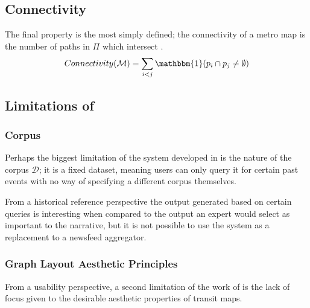 \subsection{Connectivity}
The final property is the most simply defined; the connectivity of a metro map is the number of paths in $\Pi$ which intersect \citep{GeneratingInformationMaps}.
\begin{equation}
	Connectivity(\mathcal{M}) = \sum_{i<j}\mathbbm{1}(p_i \cap p_j \neq\emptyset)
\end{equation}

\subsection{Limitations of \cite{GeneratingInformationMaps, InformationCartographyPre}}

\subsubsection{Corpus}
Perhaps the biggest limitation of the system developed in \citep{GeneratingInformationMaps, InformationCartographyPre} is the nature of the corpus $\mathcal{D}$; it is a fixed dataset, meaning users can only query it for certain past events with no way of specifying a different corpus themselves.

From a historical reference perspective the output generated based on certain queries is interesting when compared to the output an expert would select as important to the narrative, but it is not possible to use the system as a replacement to a newsfeed aggregator.

\subsubsection{Graph Layout Aesthetic Principles}

From a usability perspective, a second limitation of the work of \citeauthor{GeneratingInformationMaps} is the lack of focus given to the desirable aesthetic properties of transit maps.

